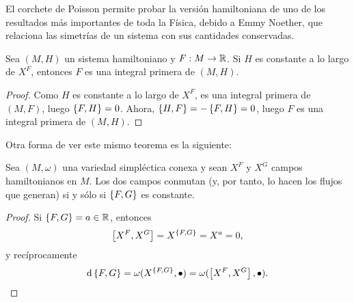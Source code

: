   El corchete de Poisson permite probar la versión hamiltoniana de uno de los resultados más importantes de toda la Física, debido a Emmy Noether, que relaciona las simetrías de un sistema con sus cantidades conservadas.
  \begin{prop}
    Sea $(M,H)$ un sistema hamiltoniano y $F:M \rightarrow \mathbb{R}$. Si $H$ es constante a lo largo de $X^F$, entonces $F$ es una integral primera de $(M,H)$. 
  \end{prop}
  \begin{proof}
    Como $H$ es constante a lo largo de $X^F$, es una integral primera de $(M,F)$, luego $\left\lbrace F,H\right\rbrace=0$. Ahora, $\left\lbrace H,F\right\rbrace=-\left\lbrace F,H\right\rbrace=0$, luego $F$ es una integral primera de $(M,H)$. 
  \end{proof}
Otra forma de ver este mismo teorema es la siguiente:
\begin{prop}
  Sea $(M,\omega)$ una variedad simpléctica conexa y sean $X^F$ y $X^G$ campos hamiltonianos en $M$. Los dos campos conmutan (y, por tanto, lo hacen los flujos que generan) si y sólo si $\left\lbrace F,G\right\rbrace$ es constante. 
\end{prop}
\begin{proof}
  Si $\left\lbrace F,G\right\rbrace=a \in \mathbb{R}$, entonces
  \begin{equation*}
    \left[X^F,X^G\right]= X^{\left\lbrace F,G\right\rbrace} = X^a=0,
  \end{equation*}
  y recíprocamente
  \begin{equation*}
    \mathrm{d}\left\lbrace F,G\right\rbrace=\omega(X^{\left\lbrace F,G\right\rbrace},\bullet)=\omega(\left[X^F,X^G\right],\bullet).
  \end{equation*}
\end{proof}

